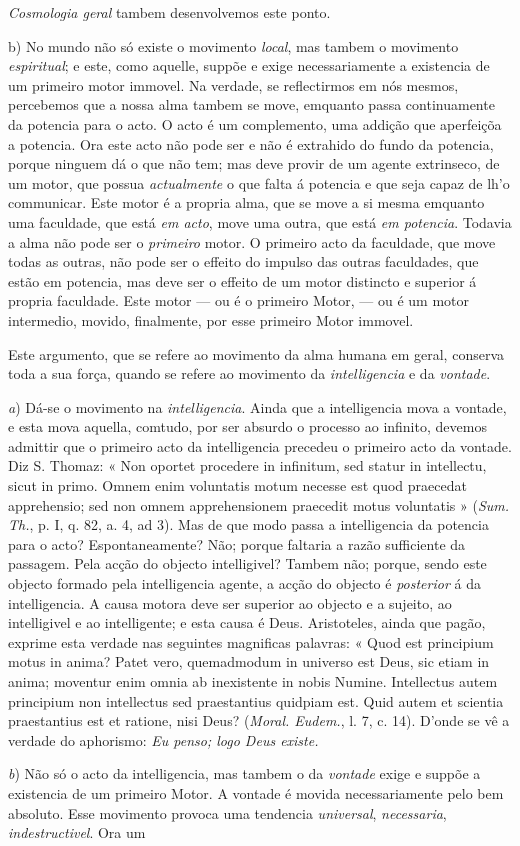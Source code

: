 \emph{Cosmologia geral} tambem desenvolvemos este ponto.\par b) No mundo não só existe o movimento \emph{local}, mas tambem o movimento \emph{espiritual}; e este, como aquelle, suppõe e exige necessariamente a existencia de um primeiro motor immovel. Na verdade, se reflectirmos em nós mesmos, percebemos que a nossa alma tambem se move, emquanto passa continuamente da potencia para o acto. O acto é um complemento, uma addição que aperfeiçõa a potencia. Ora este acto não pode ser e não é extrahido do fundo da potencia, porque ninguem dá o que não tem; mas deve provir de um agente extrinseco, de um motor, que possua \emph{actualmente} o que falta á potencia e que seja capaz de lh'o communicar. Este motor é a propria alma, que se move a si mesma emquanto uma faculdade, que está \emph{em acto}, move uma outra, que está \emph{em potencia}. Todavia a alma não pode ser o \emph{primeiro} motor. O primeiro acto da faculdade, que move todas as outras, não pode ser o effeito do impulso das outras faculdades, que estão em potencia, mas deve ser o effeito de um motor distincto e superior á propria faculdade. Este motor --- ou é o primeiro Motor, --- ou é um motor intermedio, movido, finalmente, por esse primeiro Motor immovel.\par Este argumento, que se refere ao movimento da alma humana em geral, conserva toda a sua força, quando se refere ao movimento da \emph{intelligencia} e da \emph{vontade}.\par \emph{a}) Dá-se o movimento na \emph{intelligencia}. Ainda que a intelligencia mova a vontade, e esta mova aquella, comtudo, por ser absurdo o processo ao infinito, devemos admittir que o primeiro acto da intelligencia precedeu o primeiro acto da vontade. Diz S. Thomaz: « Non oportet procedere in infinitum, sed statur in intellectu, sicut in primo. Omnem enim voluntatis motum necesse est quod praecedat apprehensio; sed non omnem apprehensionem praecedit motus voluntatis » (\emph{Sum. Th.}, p. I, q. 82, a. 4, ad 3). Mas de que modo passa a intelligencia da potencia para o acto? Espontaneamente? Não; porque faltaria a razão sufficiente da passagem. Pela acção do objecto intelligivel? Tambem não; porque, sendo este objecto formado pela intelligencia agente, a acção do objecto é \emph{posterior} á da intelligencia. A causa motora deve ser superior ao objecto e a sujeito, ao intelligivel e ao intelligente; e esta causa é Deus. Aristoteles, ainda que pagão, exprime esta verdade nas seguintes magnificas palavras: « Quod est principium motus in anima? Patet vero, quemadmodum in universo est Deus, sic etiam in anima; moventur enim omnia ab inexistente in nobis Numine. Intellectus autem principium non intellectus sed praestantius quidpiam est. Quid autem et scientia praestantius est et ratione, nisi Deus? (\emph{Moral. Eudem.}, l. 7, c. 14). D'onde se vê a verdade do aphorismo: \emph{Eu penso; logo Deus existe.}\par \emph{b}) Não só o acto da intelligencia, mas tambem o da \emph{vontade} exige e suppõe a existencia de um primeiro Motor. A vontade é movida necessariamente pelo bem absoluto. Esse movimento provoca uma tendencia \emph{universal}, \emph{necessaria}, \emph{indestructivel}. Ora um 